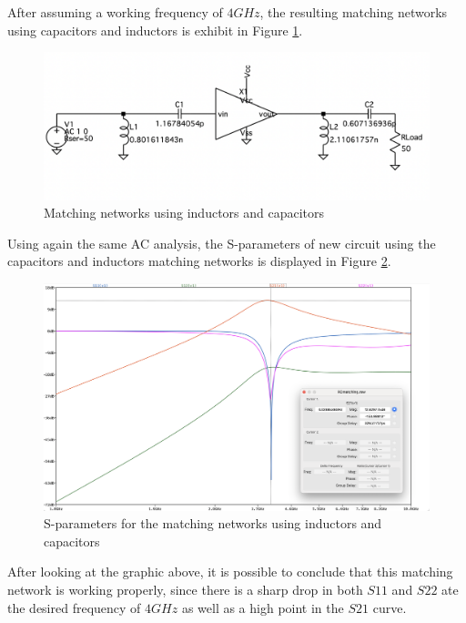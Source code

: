 After assuming a working frequency of $4 GHz$, the resulting matching networks using capacitors and inductors is exhibit in Figure \ref{fig:SIMLCMatchingCircuit}.

\begin{figure}[H]
    \centering
    \includegraphics*[scale = 0.5]{Images/SIMLCmatchingcircuit.png}
    \caption{Matching networks using inductors and capacitors}
    \label{fig:SIMLCMatchingCircuit}
\end{figure}

Using again the same AC analysis, the S-parameters of new circuit using the capacitors and inductors matching networks is displayed in Figure \ref{fig:SIMLCMatching}.

\begin{figure}[H]
    \centering
    \includegraphics*[scale = 0.3]{Images/SIMLCmatching.png}
    \caption{S-parameters for the matching networks using inductors and capacitors}
    \label{fig:SIMLCMatching}
\end{figure}

After looking at the graphic above, it is possible to conclude that this matching network is working properly, since there is a sharp drop in both $S11$ and $S22$ ate the desired frequency of $4GHz$ as well as a high point in the $S21$ curve.

